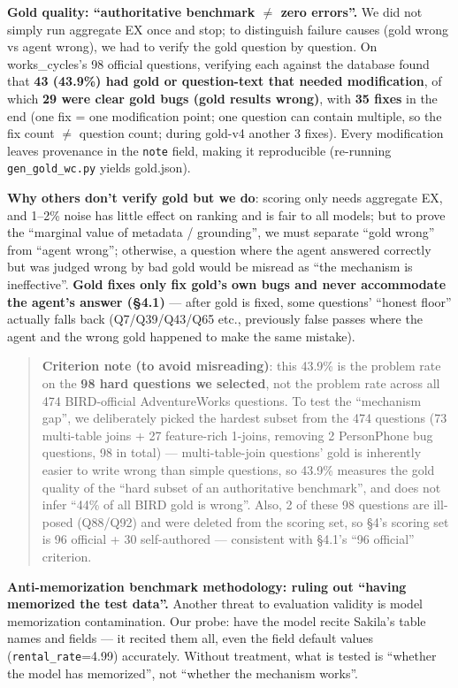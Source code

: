 \documentclass[11pt]{article}
\begin{document}
\textbf{ Gold quality: ``authoritative benchmark $\neq$ zero errors''.} We did not simply run aggregate EX once and stop; to distinguish failure causes (gold wrong vs agent wrong), we had to verify the gold question by question. On works\_cycles's 98 official questions, verifying each against the database found that \textbf{43 (43.9\%) had gold or question-text that needed modification}, of which \textbf{29 were clear gold bugs (gold results wrong)}, with \textbf{35 fixes} in the end (one fix = one modification point; one question can contain multiple, so the fix count $\neq$ question count; during gold-v4 another 3 fixes). Every modification leaves provenance in the \texttt{note} field, making it reproducible (re-running \texttt{gen\_gold\_wc.py} yields gold.json).

\textbf{Why others don't verify gold but we do}: scoring only needs aggregate EX, and 1--2\% noise has little effect on ranking and is fair to all models; but to prove the ``marginal value of metadata / grounding'', we must separate ``gold wrong'' from ``agent wrong''; otherwise, a question where the agent answered correctly but was judged wrong by bad gold would be misread as ``the mechanism is ineffective''. \textbf{Gold fixes only fix gold's own bugs and never accommodate the agent's answer (\S{}4.1)} --- after gold is fixed, some questions' ``honest floor'' actually falls back (Q7/Q39/Q43/Q65 etc., previously false passes where the agent and the wrong gold happened to make the same mistake).

\begin{quote}
\textbf{Criterion note (to avoid misreading)}: this 43.9\% is the problem rate on the \textbf{98 hard questions we selected}, not the problem rate across all 474 BIRD-official AdventureWorks questions. To test the ``mechanism gap'', we deliberately picked the hardest subset from the 474 questions (73 multi-table joins + 27 feature-rich 1-joins, removing 2 PersonPhone bug questions, 98 in total) --- multi-table-join questions' gold is inherently easier to write wrong than simple questions, so 43.9\% measures the gold quality of the ``hard subset of an authoritative benchmark'', and does not infer ``44\% of all BIRD gold is wrong''. Also, 2 of these 98 questions are ill-posed (Q88/Q92) and were deleted from the scoring set, so \S{}4's scoring set is 96 official + 30 self-authored --- consistent with \S{}4.1's ``96 official'' criterion.
\end{quote}

\textbf{ Anti-memorization benchmark methodology: ruling out ``having memorized the test data''.} Another threat to evaluation validity is model memorization contamination. Our probe: have the model recite Sakila's table names and fields --- it recited them all, even the field default values (\texttt{rental\_rate}=4.99) accurately. Without treatment, what is tested is ``whether the model has memorized'', not ``whether the mechanism works''.
\end{document}
